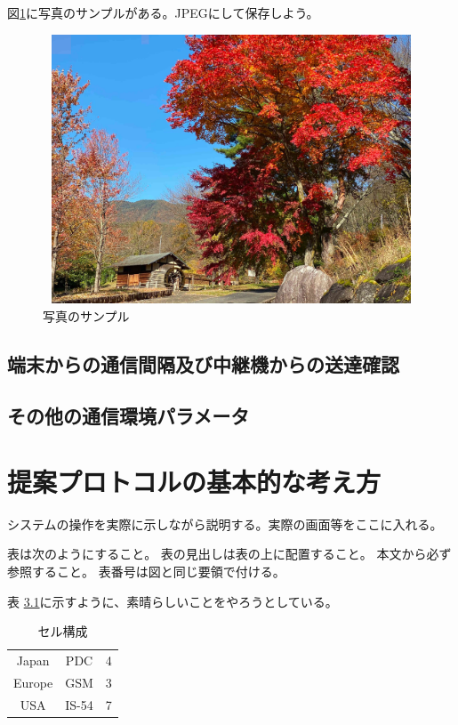 \documentclass[12pt]{jreport}
\begin{document}
図\ref{fig:pm2}に写真のサンプルがある。JPEGにして保存しよう。

\begin{figure}[htb]
    \begin{center}
        \includegraphics[width=12cm,height=8cm]{kazakosi.jpg}
    \end{center}
    \caption{写真のサンプル
        \label{fig:pm2}
    }
\end{figure}
\section{端末からの通信間隔及び中継機からの送達確認}
\section{その他の通信環境パラメータ}

\chapter{提案プロトコルの基本的な考え方}
システムの操作を実際に示しながら説明する。実際の画面等をここに入れる。

表は次のようにすること。
表の見出しは表の上に配置すること。
本文から必ず参照すること。
表番号は図と同じ要領で付ける。

表 \ref{tab:c1}に示すように、素晴らしいことをやろうとしている。

\begin{table}[htb]
    \caption{セル構成
        \label{tab:c1}
    }
    \begin{center}
        \begin{tabular}{ccc}
            \hline
            Japan  & PDC   & 4 \\
            Europe & GSM   & 3 \\
            USA    & IS-54 & 7 \\
            \hline
        \end{tabular}
    \end{center}
\end{table}
\end{document}
